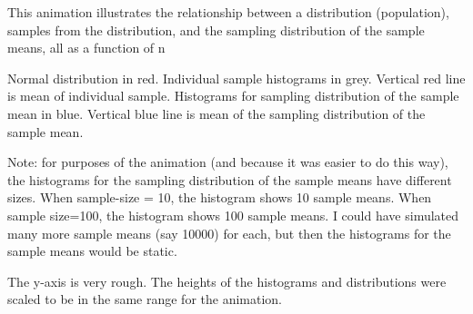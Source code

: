 \documentclass[
  letterpaper,
  DIV=11,
  numbers=noendperiod]{scrreprt}
\begin{document}
This animation illustrates the relationship between a distribution
(population), samples from the distribution, and the sampling
distribution of the sample means, all as a function of n

Normal distribution in red. Individual sample histograms in grey.
Vertical red line is mean of individual sample. Histograms for sampling
distribution of the sample mean in blue. Vertical blue line is mean of
the sampling distribution of the sample mean.

Note: for purposes of the animation (and because it was easier to do
this way), the histograms for the sampling distribution of the sample
means have different sizes. When sample-size = 10, the histogram shows
10 sample means. When sample size=100, the histogram shows 100 sample
means. I could have simulated many more sample means (say 10000) for
each, but then the histograms for the sample means would be static.

The y-axis is very rough. The heights of the histograms and
distributions were scaled to be in the same range for the animation.
\end{document}
